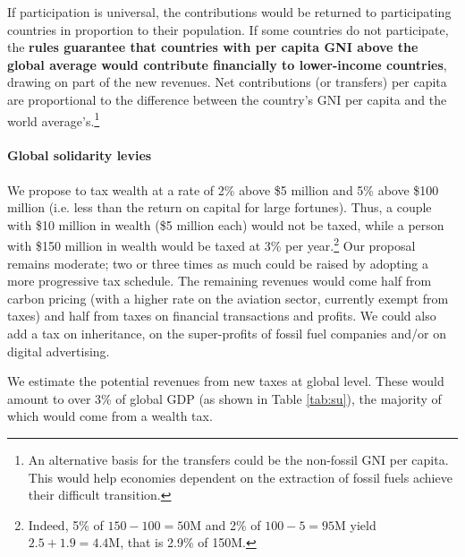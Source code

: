 \documentclass[12pt,english]{article}
\begin{document}
If participation is universal, the contributions would be returned to participating countries in proportion to their population. If some countries do not participate, 
the\textbf{ rules guarantee that countries with per capita GNI above the global average would contribute financially to lower-income countries}, drawing on part of the new revenues. Net contributions (or transfers) per capita are proportional to the difference between the country's GNI per capita and the world average's.\footnote{An alternative basis for the transfers could be the non-fossil GNI per capita. This would help economies dependent on the extraction of fossil fuels achieve their difficult transition.}

\paragraph{Global solidarity levies}
We propose to tax wealth at a rate of 2\% above \$5 million and 5\% above \$100 million (i.e. less than the return on capital for large fortunes). Thus, a couple with \$10 million in wealth (\$5 million each) would not be taxed, while a person with \$150 million in wealth would be taxed at 3\% per year.\footnote{Indeed, 5\% of $150 - 100 = 50$M and 2\% of $100 - 5 = 95$M yield $2.5 + 1.9 = 4.4$M, that is 2.9\% of 150M.} 
Our proposal remains moderate; two or three times as much could be raised by adopting a more progressive tax schedule. The remaining revenues would come half from carbon pricing (with a higher rate on the aviation sector, currently exempt from taxes) and half from taxes on financial transactions and profits. 
We could also add a tax on inheritance, on the super-profits of fossil fuel companies and/or on digital advertising.\cite{acemoglu_urgent_2024} 

We estimate the potential revenues from new taxes at global level.\cite{fabre_shared_2024} These would amount to over 3\% of global GDP (as shown in Table \ref{tab:su}), the majority of which would come from a wealth tax. %
\end{document}
